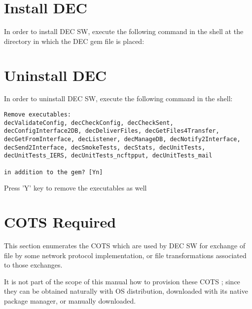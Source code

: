 \documentclass[dec_sum_main.tex]{subfiles}
\begin{document}
\par
{}

\section{Install DEC}

In order to install DEC SW, execute the following command in the shell at the directory in which the DEC gem file is placed:
\par
{}
\par

\section{Uninstall DEC}

In order to uninstall DEC SW, execute the following command in the shell:
\par 
{}
\par 

\begin{verbatim}
Remove executables:
decValidateConfig, decCheckConfig, decCheckSent, decConfigInterface2DB, decDeliverFiles, decGetFiles4Transfer, decGetFromInterface, decListener, decManageDB, decNotify2Interface, decSend2Interface, decSmokeTests, decStats, decUnitTests, decUnitTests_IERS, decUnitTests_ncftpput, decUnitTests_mail

in addition to the gem? [Yn]
\end{verbatim}

Press 'Y' key to remove the executables as well

\section{COTS Required}

This section enumerates the COTS which are used by DEC SW for exchange of file by some network protocol implementation, or file transformations associated to those exchanges.
\par
\noindent
It is not part of the scope of this manual how to provision these COTS ; since they can be obtained naturally with OS distribution, downloaded with its native package manager, or manually downloaded. 
\end{document}
